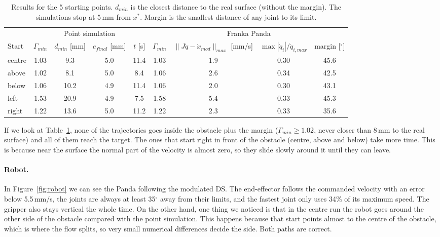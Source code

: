 ﻿\documentclass[10pt,a4paper]{article}
\begin{document}
\begin{table}[!htbp]
\centering\footnotesize\setlength{\tabcolsep}{4pt}
\begin{tabular}{lcccc|cccc}
\toprule
& \multicolumn{4}{c|}{Point simulation} & \multicolumn{4}{c}{Franka Panda}\\
Start & $\Gamma_{min}$ & $d_{min}$ [mm] & $e_{final}$ [mm] & $t$ [s] & $\Gamma_{min}$ & $\|J\dot q-\dot x_{mod}\|_{max}$ [mm/s] & $\max|\dot q_i|/\dot q_{i,max}$ & margin [$^\circ$]\\
\midrule
centre & 1.03 & 9.3  & 5.0 & 11.4 & 1.03 & 1.9 & 0.30 & 45.6 \\
above  & 1.02 & 8.1  & 5.0 & 8.4  & 1.06 & 2.6 & 0.34 & 42.5 \\
below  & 1.06 & 10.2 & 4.9 & 11.4 & 1.06 & 2.0 & 0.30 & 43.1 \\
left   & 1.53 & 20.9 & 4.9 & 7.5  & 1.58 & 5.4 & 0.33 & 45.3 \\
right  & 1.22 & 13.6 & 5.0 & 11.2 & 1.22 & 2.3 & 0.33 & 35.6 \\
\bottomrule
\end{tabular}
\caption{Results for the 5 starting points. $d_{min}$ is the closest distance to the real surface
(without the margin). The simulations stop at 5\,mm from $x^*$. Margin is the smallest distance of
any joint to its limit.}
\label{tab:res}
\end{table}

If we look at Table~\ref{tab:res}, none of the trajectories goes inside the obstacle plus the margin ($\Gamma_{min}\ge 1.02$, never closer than 8\,mm to the real surface) and all of them
reach the target. The ones that start right in front of the obstacle (centre, above and below) take
more time. This is because near the surface the normal part of the velocity is almost zero, so they
slide slowly around it until they can leave.

\paragraph{Robot.} In Figure~\ref{fig:robot} we can see the Panda following the modulated DS. The
end-effector follows the commanded velocity with an error below 5.5\,mm/s, the joints are always at
least 35$^\circ$ away from their limits, and the fastest joint only uses 34\% of its maximum speed. The
gripper also stays vertical the whole time. On the other hand, one thing we noticed is that in the centre run the robot
goes around the other side of the obstacle compared with the point simulation. This happens because
that start points almost to the centre of the obstacle, which is where the flow splits, so very small
numerical differences decide the side. Both paths are correct.
\end{document}
